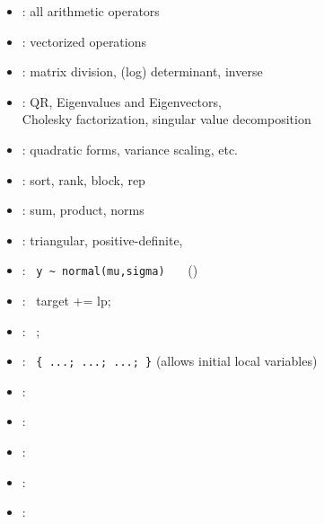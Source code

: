 \documentclass[10pt]{report}
\begin{document}
%
\begin{itemize}\small
\item {}: all arithmetic operators
\item {}: vectorized operations
\item {}: matrix division, (log) determinant,
  inverse
\item {}: QR, Eigenvalues and Eigenvectors,
  \\
  Cholesky factorization, singular value decomposition
\item {}: quadratic forms, variance scaling, etc.
\item {}: sort, rank, block, rep
\item {}: sum, product, norms
\item {}: triangular, positive-definite,
\end{itemize}


%
\begin{itemize}
\item {}: \ {\footnotesize \Verb|y ~ normal(mu,sigma)|}
  \ \ \ {\footnotesize ()}
\item {}: \ {\footnotesize target += lp;}
\item {}: \  {\footnotesize {};}
\end{itemize}


%
\begin{itemize}
\item {}: \ {\footnotesize \Verb|{ ...; ...; ...; }|}
  \hfill {\footnotesize
    (allows initial local variables)}
\end{itemize}

%
\begin{itemize}
\item {}: \ {\footnotesize {}}
\item {}: \ {\footnotesize {}}
\item {}: \ {\footnotesize
    }
\item {}: \ {\footnotesize {}}
\item {}: \ {\footnotesize {}}
\end{itemize}
\end{document}
